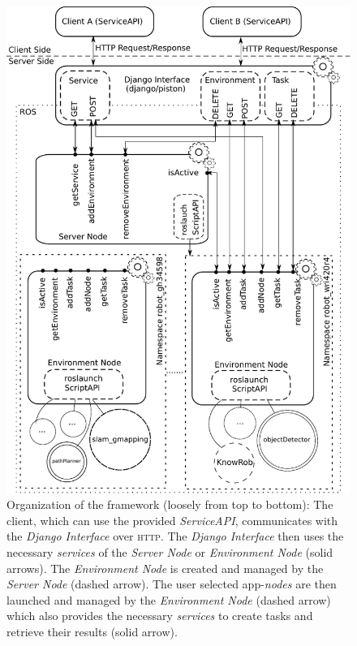 \documentclass[10pt,a4paper]{article}
\begin{document}
		\begin{figure}
			\begin{center}
				\def\svgwidth{\columnwidth}
				\includegraphics{frameworkOverview.pdf}				
				\caption{Organization of the framework (loosely from top to bottom): The client,
				which can use the provided \emph{ServiceAPI}, communicates with the
				\emph{Django Interface} over \textsc{http}. The \emph{Django Interface} then uses the
				necessary \emph{services} of the \emph{Server Node} or \emph{Environment Node} (solid
				arrows). The \emph{Environment Node} is created and managed by the \emph{Server Node}
				(dashed arrow). The user selected app-\emph{nodes} are then launched and managed by
				the \emph{Environment Node} (dashed arrow) which also provides the necessary
				\emph{services} to create tasks and retrieve their results (solid arrow).}
				\label{fig:diagram}
			\end{center}
		\end{figure}
\end{document}
